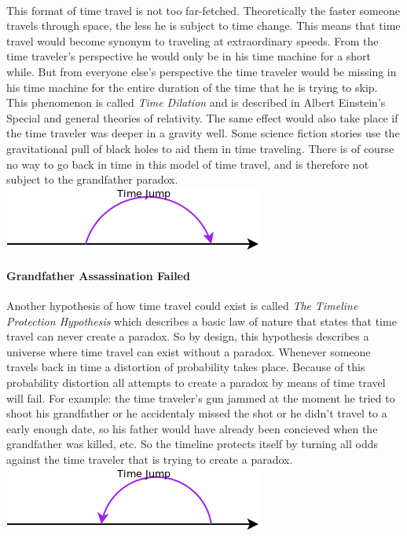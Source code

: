 \paragraph{}
This format of time travel is not too far-fetched. Theoretically the faster someone travels through space, the less he is subject to time change. This means that time travel would become synonym to traveling at extraordinary speeds. From the time traveler's perspective he would only be in his time machine for a short while. But from everyone else's perspective the time traveler would be missing in his time machine for the entire duration of the time that he is trying to skip. This phenomenon is called \emph{Time Dilation} and is described in Albert Einstein's Special and general theories of relativity. The same effect would also take place if the time traveler was deeper in a gravity well. Some science fiction stories use the gravitational pull of black holes to aid them in time traveling. There is of course no way to go back in time in this model of time travel, and is therefore not subject to the grandfather paradox.
\includegraphics[scale=0.5]{./images/forward.png}

\paragraph{Grandfather Assassination Failed}
Another hypothesis of how time travel could exist is called \emph{The Timeline Protection Hypothesis} which describes a basic law of nature that states that time travel can never create a paradox. So by design, this hypothesis describes a universe where time travel can exist without a paradox. Whenever someone travels back in time a distortion of probability takes place. Because of this probability distortion all attempts to create a paradox by means of time travel will fail. For example: the time traveler's gun jammed at the moment he tried to shoot his grandfather or he accidentaly missed the shot or he didn't travel to a early enough date, so his father would have already been concieved when the grandfather was killed, etc. So the timeline protects itself by turning all odds against the time traveler that is trying to create a paradox.
\\
\includegraphics[scale=0.5]{./images/fail.png}

